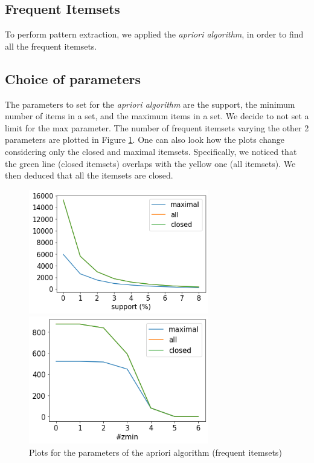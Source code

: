 \documentclass[a4paper,11pt,dvipsnames]{article}
\begin{document}
\subsection{Frequent Itemsets}
To perform pattern extraction, we applied the \textit{apriori algorithm}, in order to find all the frequent itemsets.

\subsection{Choice of parameters}
The parameters to set for the \textit{apriori algorithm} are the support, the minimum number of items in a set, and the maximum items in a set. We decide to not set a limit for the max parameter. The number of frequent itemsets varying the other 2 parameters are plotted in Figure \ref{fig:itemset_parameters}. One can also look how the plots change considering only the closed and maximal itemsets. Specifically, we noticed that the green line (closed itemsets) overlaps with the yellow one (all itemsets). We then deduced that all the itemsets are closed.

\begin{figure}[h]
\begin{minipage}{0.51\linewidth}
    \centering
    \includegraphics[width=0.7\textwidth]{support.png}
    \end{minipage}
    \hfil
    \begin{minipage}{0.46\linewidth}
    \centering
    \includegraphics[width=0.7\textwidth]{zmin.png}
    \end{minipage}
    \caption{Plots for the parameters of the apriori algorithm (frequent itemsets)}
    \label{fig:itemset_parameters}
\end{figure}
\end{document}
